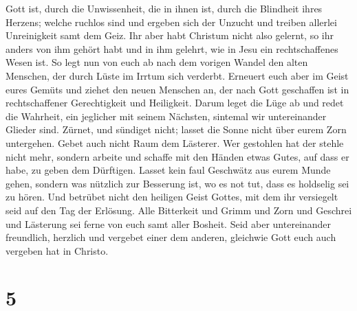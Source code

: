 Gott ist, durch die Unwissenheit, die in ihnen ist, durch die Blindheit
ihres Herzens;  welche ruchlos sind und ergeben sich der
Unzucht und treiben allerlei Unreinigkeit samt dem Geiz. 
Ihr aber habt Christum nicht also gelernt,  so ihr anders
von ihm gehört habt und in ihm gelehrt, wie in Jesu ein rechtschaffenes
Wesen ist.  So legt nun von euch ab nach dem vorigen
Wandel den alten Menschen, der durch Lüste im Irrtum sich verderbt.
 Erneuert euch aber im Geist eures Gemüts 
und ziehet den neuen Menschen an, der nach Gott geschaffen ist in
rechtschaffener Gerechtigkeit und Heiligkeit.  Darum
leget die Lüge ab und redet die Wahrheit, ein jeglicher mit seinem
Nächsten, sintemal wir untereinander Glieder sind. 
Zürnet, und sündiget nicht; lasset die Sonne nicht über eurem Zorn
untergehen.  Gebet auch nicht Raum dem Lästerer.
 Wer gestohlen hat der stehle nicht mehr, sondern arbeite
und schaffe mit den Händen etwas Gutes, auf dass er habe, zu geben dem
Dürftigen.  Lasset kein faul Geschwätz aus eurem Munde
gehen, sondern was nützlich zur Besserung ist, wo es not tut, dass es
holdselig sei zu hören.  Und betrübet nicht den heiligen
Geist Gottes, mit dem ihr versiegelt seid auf den Tag der Erlösung.
 Alle Bitterkeit und Grimm und Zorn und Geschrei und
Lästerung sei ferne von euch samt aller Bosheit.  Seid
aber untereinander freundlich, herzlich und vergebet einer dem anderen,
gleichwie Gott euch auch vergeben hat in Christo.

\hypertarget{section-4}{%
\section{5}\label{section-4}}

